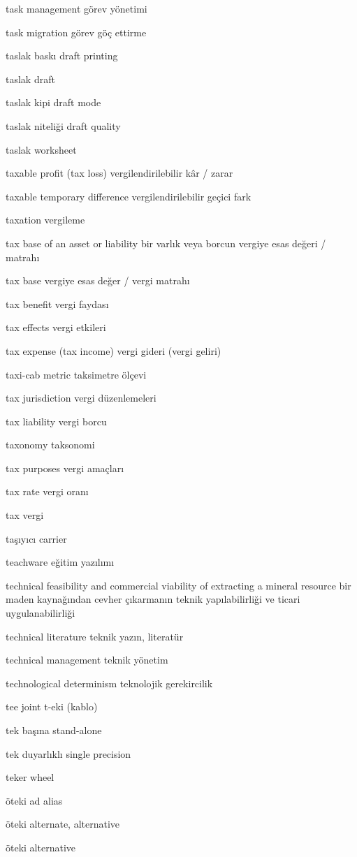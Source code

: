 \documentclass[12pt,fleqn]{article}\usepackage{../../common}
\begin{document}
task management görev yönetimi

task migration görev göç ettirme

taslak baskı draft printing

taslak draft

taslak kipi draft mode

taslak niteliği draft quality

taslak worksheet

taxable profit (tax loss) vergilendirilebilir kâr / zarar

taxable temporary difference vergilendirilebilir geçici fark

taxation vergileme

tax base of an asset or liability bir varlık veya borcun vergiye esas değeri / matrahı

tax base vergiye esas değer / vergi matrahı

tax benefit vergi faydası

tax effects vergi etkileri

tax expense (tax income) vergi gideri (vergi geliri)

taxi-cab metric taksimetre ölçevi

tax jurisdiction vergi düzenlemeleri

tax liability vergi borcu

taxonomy taksonomi

tax purposes vergi amaçları

tax rate vergi oranı

tax vergi

taşıyıcı carrier

teachware eğitim yazılımı

technical feasibility and commercial viability of extracting a mineral resource bir maden kaynağından cevher çıkarmanın teknik yapılabilirliği ve ticari uygulanabilirliği

technical literature teknik yazın, literatür

technical management teknik yönetim

technological determinism teknolojik gerekircilik

tee joint t-eki (kablo)

tek başına stand-alone

tek duyarlıklı single precision

teker wheel

öteki ad alias

öteki alternate, alternative

öteki alternative
\end{document}
